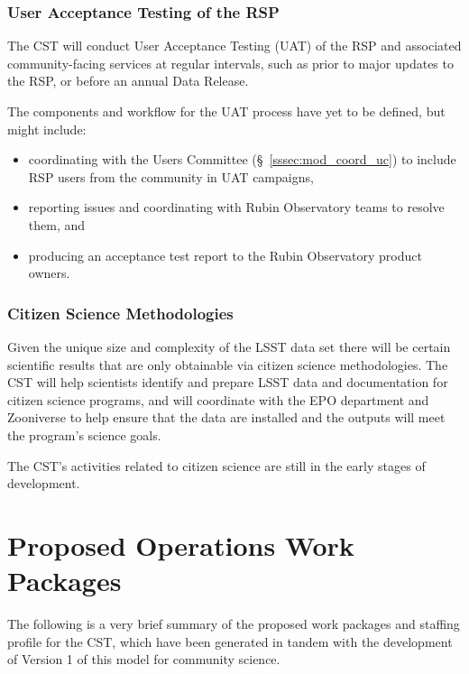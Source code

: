 \documentclass[DM,authoryear,toc]{lsstdoc}
\begin{document}
\subsubsection{User Acceptance Testing of the RSP}\label{sssec:mod_dev_uat}

The CST will conduct User Acceptance Testing (UAT) of the RSP and associated community-facing services at regular intervals, such as prior to major updates to the RSP, or before an annual Data Release.

The components and workflow for the UAT process have yet to be defined, but might include:
\begin{itemize}
\item coordinating with the Users Committee (\S~\ref{sssec:mod_coord_uc}) to include RSP users from the community in UAT campaigns,
\item reporting issues and coordinating with Rubin Observatory teams to resolve them, and
\item producing an acceptance test report to the Rubin Observatory product owners.
\end{itemize}


\subsubsection{Citizen Science Methodologies}\label{sssec:mod_dev_citizen}

Given the unique size and complexity of the LSST data set there will be certain scientific results that are only obtainable via citizen science methodologies.
The CST will help scientists identify and prepare LSST data and documentation for citizen science programs, and will coordinate with the EPO department and Zooniverse to help ensure that the data are installed and the outputs will meet the program's science goals.

The CST's activities related to citizen science are still in the early stages of development.






\section{Proposed Operations Work Packages}\label{sec:comp}

The following is a very brief summary of the proposed work packages and staffing profile for the CST, which have been generated in tandem with the development of Version 1 of this model for community science.
\end{document}
